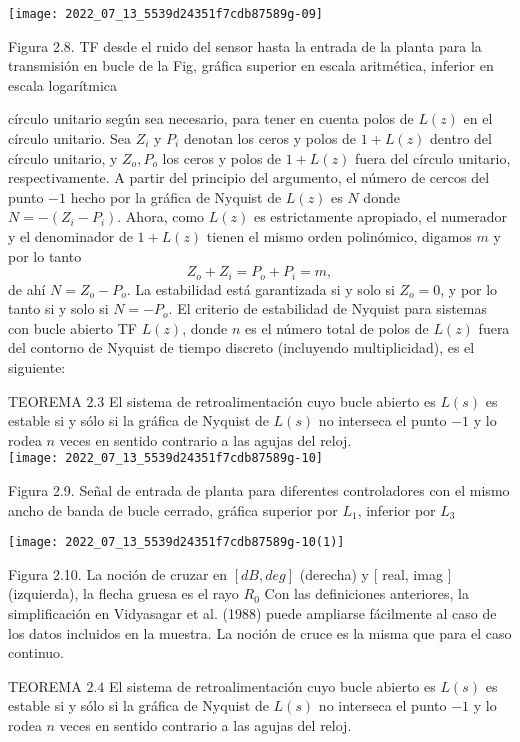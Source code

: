 \texttt{[image: 2022\_07\_13\_5539d24351f7cdb87589g-09]}

Figura 2.8. TF desde el ruido del sensor hasta la entrada de la planta para la transmisión en bucle de la Fig, gráfica superior en escala aritmética, inferior en escala logarítmica

círculo unitario según sea necesario, para tener en cuenta polos de $L(z)$ en el círculo unitario. Sea $Z_{i}$ y $P_{i}$ denotan los ceros y polos de $1+L(z)$ dentro del círculo unitario, y $Z_{o}, P_{o}$ los ceros y polos de $1+L(z)$ fuera del círculo unitario, respectivamente. A partir del principio del argumento, el número de cercos del punto $-1$ hecho por la gráfica de Nyquist de $L(z)$ es $N$ donde $N=-\left(Z_{i}-P_{i}\right)$. Ahora, como $L(z)$ es estrictamente apropiado, el numerador y el denominador de $1+L(z)$ tienen el mismo orden polinómico, digamos $m$ y por lo tanto
$$
Z_{o}+Z_{i}=P_{o}+P_{i}=m,
$$
de ahí $N=Z_{o}-P_{o}$. La estabilidad está garantizada si y solo si $Z_{o}=0$, y por lo tanto si y solo si $N=-P_{o}$. El criterio de estabilidad de Nyquist para sistemas con bucle abierto TF $L(z)$, donde $n$ es el número total de polos de $L(z)$ fuera del contorno de Nyquist de tiempo discreto (incluyendo multiplicidad), es el siguiente:

TEOREMA $2.3$ El sistema de retroalimentación cuyo bucle abierto es $L(s)$ es estable si y sólo si la gráfica de Nyquist de $L(s)$ no interseca el punto $-1$ y lo rodea $n$ veces en sentido contrario a las agujas del reloj.\\

\texttt{[image: 2022\_07\_13\_5539d24351f7cdb87589g-10]}

Figura 2.9. Señal de entrada de planta para diferentes controladores con el mismo ancho de banda de bucle cerrado, gráfica superior por $L_{1}$, inferior por $L_{3}$

\texttt{[image: 2022\_07\_13\_5539d24351f7cdb87589g-10(1)]}

Figura 2.10. La noción de cruzar en $[d B, d e g]$ (derecha) y $[$ real, imag $]$ (izquierda), la flecha gruesa es el rayo $R_{0}$ Con las definiciones anteriores, la simplificación en Vidyasagar et al. (1988) puede ampliarse fácilmente al caso de los datos incluidos en la muestra. La noción de cruce es la misma que para el caso continuo.

TEOREMA $2.4$ El sistema de retroalimentación cuyo bucle abierto es $L(s)$ es estable si y sólo si la gráfica de Nyquist de $L(s)$ no interseca el punto $-1$ y lo rodea $n$ veces en sentido contrario a las agujas del reloj.

